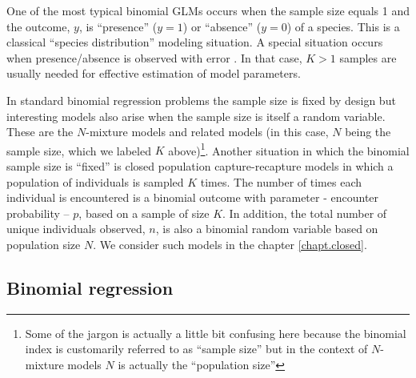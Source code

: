 One of the most typical binomial GLMs occurs when the sample size
equals 1 and the outcome, $y$, is ``presence'' ($y=1$) or ``absence''
($y=0$) of a species. This is a classical ``species distribution''
modeling situation. A special situation occurs when presence/absence
is observed with error \citep{mackenzie_etal:2002,tyre_etal:2003}.
In that case, $K>1$ samples
are usually needed for effective estimation of model parameters.

 In standard binomial regression problems the sample size
is fixed by design but interesting models also arise when the sample
size is itself a random variable. These are the $N$-mixture models
\citep{royle:2004, kery_etal:2005, royle_dorazio:2008, kery:2010}
and related models (in this case, $N$ being the sample size,
which we labeled $K$ above)\footnote{Some of the jargon is actually a little
bit confusing here
because the binomial index is customarily referred to as ``sample size''
but in the context of $N$-mixture models $N$ is actually the
``population size''}.
Another
situation in which the binomial sample size is ``fixed'' is closed
population capture-recapture models in which a population of
individuals is sampled $K$ times.  The number of times each individual
is encountered is a binomial outcome with parameter - encounter
probability -- $p$, based on a sample of size $K$.  In addition, the
total number of unique individuals observed, $n$, is also a binomial
random variable based on population size $N$.  We consider such
models in the chapter \ref{chapt.closed}.


\subsection{Binomial regression}

